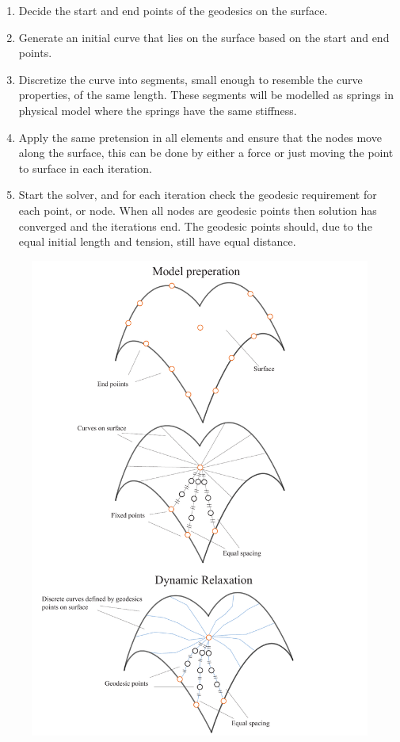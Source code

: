 \begin{enumerate}
\item Decide the start and end points of the geodesics on the surface.
\item Generate an initial curve that lies on the surface based on the start and end points.
\item Discretize  the curve into segments, small enough to resemble the curve properties, of the same length. These segments will be modelled as springs in physical model where the springs have the same stiffness.
\item Apply the same pretension in all elements and ensure that the nodes move along the surface, this can be done by either a force or just moving the point to surface in each iteration. 
\item Start the solver, and for each iteration check the geodesic requirement for each point, or node. When all nodes are geodesic points then solution has converged and the iterations end. The geodesic points should, due to the equal initial length and tension, still have equal distance. 

\end{enumerate}

\begin{figure}[H]
\centering
\includegraphics[width = 1.0\linewidth ]{figure/Method/Stepps.pdf}

\end{figure}

